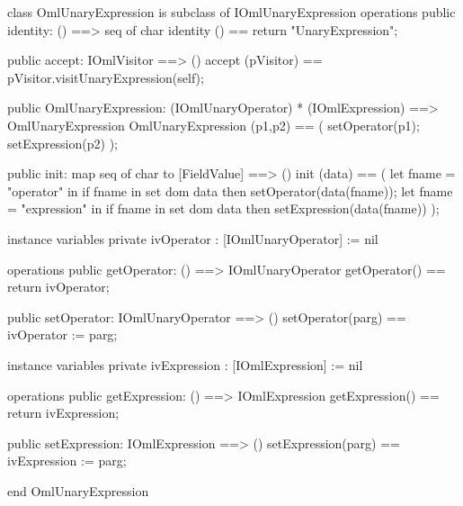 \begin{vdm_al}
class OmlUnaryExpression is subclass of IOmlUnaryExpression
operations
  public identity: () ==> seq of char
  identity () == return "UnaryExpression";

  public accept: IOmlVisitor ==> ()
  accept (pVisitor) == pVisitor.visitUnaryExpression(self);

  public OmlUnaryExpression:
      (IOmlUnaryOperator) *
      (IOmlExpression) ==> OmlUnaryExpression
  OmlUnaryExpression (p1,p2) == 
   ( setOperator(p1);
     setExpression(p2) );

  public init: map seq of char to [FieldValue] ==> ()
  init (data) ==
    ( let fname = "operator" in
        if fname in set dom data
        then setOperator(data(fname));
      let fname = "expression" in
        if fname in set dom data
        then setExpression(data(fname)) );

instance variables
  private ivOperator : [IOmlUnaryOperator] := nil

operations
  public getOperator: () ==> IOmlUnaryOperator
  getOperator() == return ivOperator;

  public setOperator: IOmlUnaryOperator ==> ()
  setOperator(parg) == ivOperator := parg;

instance variables
  private ivExpression : [IOmlExpression] := nil

operations
  public getExpression: () ==> IOmlExpression
  getExpression() == return ivExpression;

  public setExpression: IOmlExpression ==> ()
  setExpression(parg) == ivExpression := parg;

end OmlUnaryExpression
\end{vdm_al}

